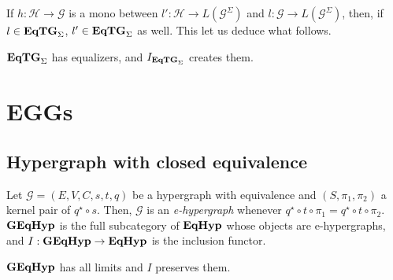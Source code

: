 \documentclass[a4paper,UKenglish,cleveref,pdftex,thm-restate,numberwithinsect]{lipics-v2021}
\newcommand{\catname}[1]{\textbf{\textup{#1}}}
\newcommand{\EqHyp}{\catname{EqHyp}} %
\newcommand{\EqTGs}{\catname{EqTG}_{\Sigma}}
\newcommand{\egg}{\catname{GEqHyp}}
\begin{document}
If $h: \mathcal{H \to G}$ is a mono between $l': \mathcal{H} \to L(\mathcal{G}^\Sigma)$ and $l: \mathcal{G}\to L(\mathcal{G}^\Sigma)$, then, if $l\in\EqTGs$, $l'\in\EqTGs$ as well. This let us deduce what follows.

\begin{proposition}
	$\EqTGs$ has equalizers, and $I_{\EqTGs}$ creates them.
\end{proposition}


\section{EGGs}
\label{eggs}


\subsection{Hypergraph with closed equivalence}
\begin{definition}
	Let $\mathcal{G} = (E, V, C, s, t, q)$ be a hypergraph with equivalence and $(S, \pi_1, \pi_2)$ a kernel pair of $q^\star \circ s$.
	Then, $\mathcal{G}$ is an \emph{e-hypergraph} whenever $q^\star \circ t \circ \pi_1 = q^\star \circ t \circ \pi_2$.
	$\egg$ is the full subcategory of $\EqHyp$ whose objects are e-hypergraphs, and $I: \egg \to \EqHyp$ is the inclusion functor.
\end{definition}

\begin{lemma}
	$\egg$ has all limits and $I$ preserves them.
\end{lemma}
\end{document}
